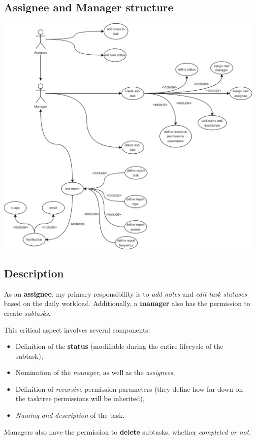 \documentclass{article}
\begin{document}
\subsection{Assignee and Manager structure}
\includegraphics[width=\textwidth, keepaspectratio]{images/UseCaseDiagram/UseCaseAssigneeManager.jpg}
\subsection*{Description}
As an \textbf{assignee}, my primary responsibility is to \textit{add notes} and \textit{edit task statuses} based on the daily workload. Additionally, a \textbf{manager} also has the permission to create \textit{subtasks}.

This critical aspect involves several components:
\begin{itemize}
\item Definition of the \textbf{status} (modifiable during the entire lifecycle of the subtask),
\item Nomination of the \textit{manager}, as well as the \textit{assignees},
\item Definition of \textit{recursive} permission parameters (they define how far down on the tasktree permissions will be inherited),
\item \textit{Naming and description} of the task.
\end{itemize}

Managers also have the permission to \textbf{delete} subtasks, whether \textit{completed or not}.
\end{document}
